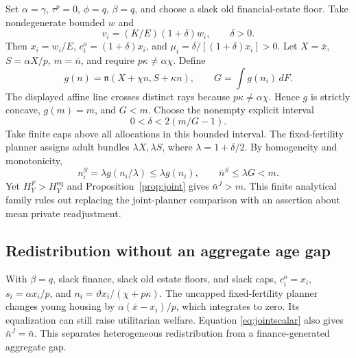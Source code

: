 \documentclass[11pt]{article}
\newcommand{\dd}{\,d}
\newcommand{\eq}{\mathrm{eq}}
\newcommand{\tht}{\vartheta}
\begin{document}
Set $\alpha=\gamma$, $\tau^p=0$, $\phi=q$, $\beta=q$, and choose a slack old financial-estate floor. Take nondegenerate bounded $w$ and
\[
 v_i=(K/E)(1+\delta)w_i,\qquad \delta>0.
\]
Then $x_i=w_i/E$, $c_i^o=(1+\delta)x_i$, and
$\mu_i=\delta/[(1+\delta)x_i]>0$. Let $X=\bar x$, $S=\alpha X/p$, $m=\bar n$, and require $p\kappa\ne\alpha\chi$. Define
\[
 g(n)=\mathfrak n(X+\chi n,S+\kappa n),\qquad G=\int g(n_i)\dd F.
\]
The displayed affine line crosses distinct rays because $p\kappa\ne\alpha\chi$. Hence $g$ is strictly concave, $g(m)=m$, and $G<m$. Choose the nonempty explicit interval
\begin{equation}
 0<\delta<2(m/G-1).\label{eq:sequentialcounter}
\end{equation}
Take finite caps above all allocations in this bounded interval. The fixed-fertility planner assigns adult bundles $\lambda X,\lambda S$, where $\lambda=1+\delta/2$. By homogeneity and monotonicity,
\[
 n_i^S=\lambda g(n_i/\lambda)\le\lambda g(n_i),\qquad
 \bar n^S\le\lambda G<m.
\]
Yet $H_Y^F>H_Y^{\eq}$ and Proposition~\ref{prop:joint} gives $\bar n^J>m$. This finite analytical family rules out replacing the joint-planner comparison with an assertion about mean private readjustment.

\subsection{Redistribution without an aggregate age gap}
With $\beta=q$, slack finance, slack old estate floors, and slack caps, $c_i^o=x_i$, $s_i=\alpha x_i/p$, and $n_i=\tht x_i/(\chi+p\kappa)$. The uncapped fixed-fertility planner changes young housing by $\alpha(\bar x-x_i)/p$, which integrates to zero. Its equalization can still raise utilitarian welfare. Equation \eqref{eq:jointscalar} also gives $\bar n^J=\bar n$. This separates heterogeneous redistribution from a finance-generated aggregate gap.
\end{document}
